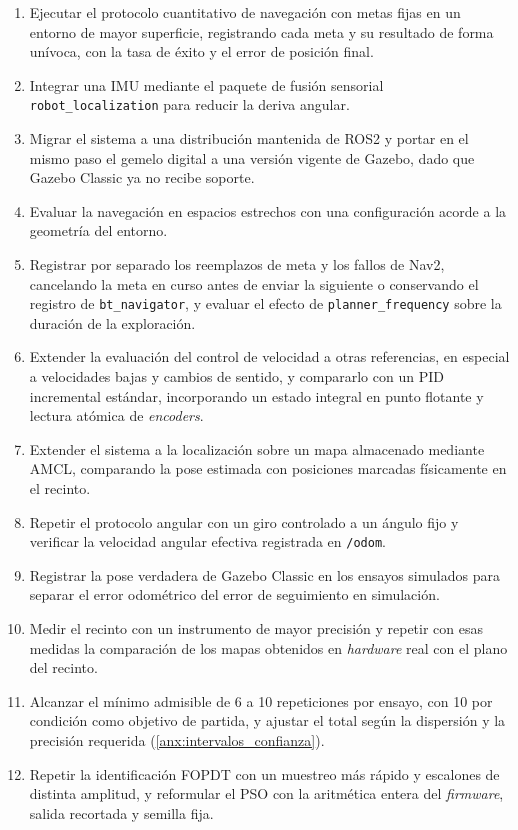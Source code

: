 \begin{enumerate}
\item Ejecutar el protocolo cuantitativo de navegación con metas fijas en un entorno de mayor superficie, registrando cada meta y su resultado de forma unívoca, con la tasa de éxito y el error de posición final.
\item Integrar una \gls{IMU} mediante el paquete de fusión sensorial \texttt{robot\_localization} para reducir la deriva angular.
\item Migrar el sistema a una distribución mantenida de \gls{ROS2} y portar en el mismo paso el gemelo digital a una versión vigente de Gazebo, dado que Gazebo Classic ya no recibe soporte.
\item Evaluar la navegación en espacios estrechos con una configuración acorde a la geometría del entorno.
\item Registrar por separado los reemplazos de meta y los fallos de Nav2, cancelando la meta en curso antes de enviar la siguiente o conservando el registro de \texttt{bt\_navigator}, y evaluar el efecto de \texttt{planner\_frequency} sobre la duración de la exploración.
\item Extender la evaluación del control de velocidad a otras referencias, en especial a velocidades bajas y cambios de sentido, y
compararlo con un PID incremental estándar, incorporando un estado integral en
punto flotante y lectura atómica de \textit{encoders}.
\item Extender el sistema a la localización sobre un mapa almacenado mediante AMCL, comparando la pose estimada con posiciones marcadas físicamente en el recinto.
\item Repetir el protocolo angular con un giro controlado a un ángulo fijo y verificar la velocidad angular efectiva registrada en \texttt{/odom}.
\item Registrar la pose verdadera de Gazebo Classic en los ensayos simulados para separar el error odométrico del error de seguimiento en simulación.
\item Medir el recinto con un instrumento de mayor precisión y repetir con esas medidas la comparación de los mapas obtenidos en \textit{hardware} real con el plano del recinto.
\item Alcanzar el mínimo admisible de 6 a 10 repeticiones por ensayo, con 10 por condición como objetivo de partida, y ajustar el total según la dispersión y la precisión requerida (\ref{anx:intervalos_confianza}).
\item Repetir la identificación FOPDT con un muestreo más rápido y escalones de distinta amplitud, y reformular el PSO con la aritmética entera del \textit{firmware}, salida recortada y semilla fija.
\end{enumerate}
